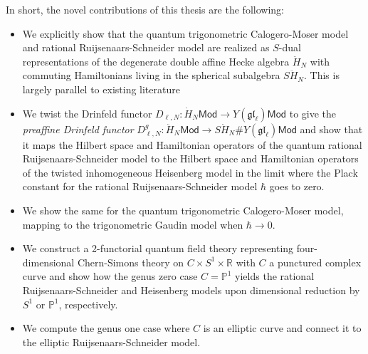 \documentclass[11pt]{report}
\theoremstyle{definition}
\theoremstyle{remark}
\theoremstyle{remark}
\newcommand{\R}{\mathbb{R}}
\renewcommand{\P}{\mathbb{P}}
\begin{document}
In short, the novel contributions of this thesis are the following:
\begin{itemize}
\item We explicitly show that the quantum trigonometric Calogero-Moser model and rational Ruijsenaars-Schneider model are realized as $S$-dual representations of the degenerate double affine Hecke algebra $\ddot H_N$ with commuting Hamiltonians living in the spherical subalgebra $S\ddot H_N$. This is largely parallel to existing literature
\item We twist the Drinfeld functor $D_{\ell,N}: \dot H_N \mathsf{Mod} \to Y(\mathfrak{gl}_\ell) \mathsf{Mod}$ to give the \emph{preaffine Drinfeld functor} $D_{\ell,N}^g: \ddot H_N \mathsf{Mod} \to S\ddot H_N \# Y(\mathfrak{gl}_\ell) \mathsf{Mod}$ and show that it maps the Hilbert space and Hamiltonian operators of the quantum rational Ruijsenaars-Schneider model to the Hilbert space and Hamiltonian operators of the twisted inhomogeneous Heisenberg model in the limit where the Plack constant for the rational Ruijsenaars-Schneider model $\hbar$ goes to zero.
\item We show the same for the quantum trigonometric Calogero-Moser model, mapping to the trigonometric Gaudin model when $\hbar \to 0$.
\item We construct a 2-functorial quantum field theory representing four-dimensional Chern-Simons theory on $C \times S^1 \times \R$ with $C$ a punctured complex curve and show how the genus zero case $C = \P^1$ yields the rational Ruijsenaars-Schneider and Heisenberg models upon dimensional reduction by $S^1$ or $\P^1$, respectively.
\item We compute the genus one case where $C$ is an elliptic curve and connect it to the elliptic Ruijsenaars-Schneider model.
\end{itemize}
\end{document}
